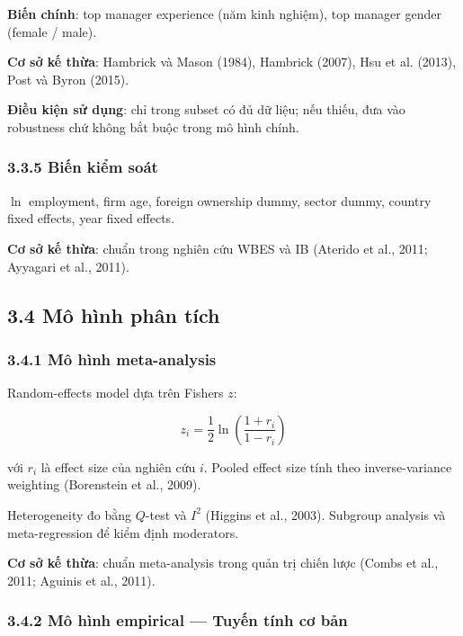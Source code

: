 \documentclass[12pt,a4paper]{article}
\begin{document}
\textbf{Biến chính}: top manager experience (năm kinh nghiệm), top
manager gender (female / male).

\textbf{Cơ sở kế thừa}: Hambrick và Mason (1984), Hambrick (2007), Hsu
et al. (2013), Post và Byron (2015).

\textbf{Điều kiện sử dụng}: chỉ trong subset có đủ dữ liệu; nếu thiếu,
đưa vào robustness chứ không bắt buộc trong mô hình chính.

\hypertarget{335-biux1ebfn-kiux1ec3m-souxe1t}{%
\subsubsection{3.3.5 Biến kiểm
soát}\label{335-biux1ebfn-kiux1ec3m-souxe1t}}

\(\ln\) employment, firm age, foreign ownership dummy, sector dummy,
country fixed effects, year fixed effects.

\textbf{Cơ sở kế thừa}: chuẩn trong nghiên cứu WBES và IB (Aterido et
al., 2011; Ayyagari et al., 2011).

\hypertarget{34-muxf4-huxecnh-phuxe2n-tuxedch}{%
\subsection{3.4 Mô hình phân
tích}\label{34-muxf4-huxecnh-phuxe2n-tuxedch}}

\hypertarget{341-muxf4-huxecnh-meta-analysis}{%
\subsubsection{3.4.1 Mô hình
meta-analysis}\label{341-muxf4-huxecnh-meta-analysis}}

Random-effects model dựa trên Fisher\textquotesingle s \(z\):

\[z_i = \frac{1}{2} \ln\left(\frac{1+r_i}{1-r_i}\right)\]

với \(r_i\) là effect size của nghiên cứu \(i\). Pooled effect size tính
theo inverse-variance weighting (Borenstein et al., 2009).

Heterogeneity đo bằng \(Q\)-test và \(I^2\) (Higgins et al., 2003).
Subgroup analysis và meta-regression để kiểm định moderators.

\textbf{Cơ sở kế thừa}: chuẩn meta-analysis trong quản trị chiến lược
(Combs et al., 2011; Aguinis et al., 2011).

\hypertarget{342-muxf4-huxecnh-empirical--tuyux1ebfn-tuxednh-cux1a1-bux1ea3n}{%
\subsubsection{3.4.2 Mô hình empirical --- Tuyến tính cơ
bản}\label{342-muxf4-huxecnh-empirical--tuyux1ebfn-tuxednh-cux1a1-bux1ea3n}}
\end{document}
